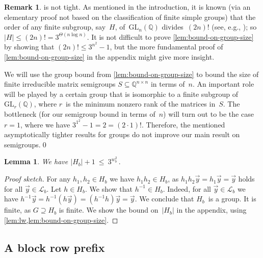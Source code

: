 \documentclass{lmcs}
\newtheorem{lemma}[thm]{Lemma}
\theoremstyle{definition}
\newtheorem{remark}[thm]{Remark}
\newcommand{\GL}{\mathrm{GL}}
\newcommand{\cL}{\mathcal{L}}
\newcommand{\Q}{\mathbb{Q}}
\begin{document}
\begin{remark} \label{rem:bound-on-group-size}
 is not tight.
As mentioned in the introduction, it is known (via an elementary proof not based on the classification of finite simple groups) that the order of any finite subgroup, say~$H$, of~$\GL_n(\Q)$ divides~$(2 n)!$ (see, e.g., \cite[Chapter~IX]{Newman1972}); so $|H| \le (2 n)! = 3^{\Theta(n \log n)}$.
It is not difficult to prove \cref{lem:bound-on-group-size} by showing that $(2 n)! \le 3^{n^2}-1$, but the more fundamental proof of \cref{lem:bound-on-group-size} in the appendix might give more insight.

We will use the group bound from \cref{lem:bound-on-group-size} to bound the size of finite irreducible matrix semigroups $S \subseteq \Q^{n \times n}$ in terms of~$n$.
An important role will be played by a certain group that is isomorphic to a finite subgroup of~$\GL_r(\Q)$, where $r$~is the minimum nonzero rank of the matrices in~$S$.
The bottleneck (for our semigroup bound in terms of~$n$) will turn out to be the case $r=1$, where we have $3^{1^2}-1 = 2 = (2 \cdot 1)!$.
Therefore, the mentioned asymptotically tighter results for groups do not improve our main result on semigroups.\qed
\end{remark}



\begin{lemma} \label{lem:Hb-bound}
We have
$
 |H_b| + 1 \ \le \ 3^{w_b^2}\,.
$
\end{lemma}
\begin{proof}[Proof sketch]
For any $h_1, h_2 \in H_b$ we have $h_1 h_2 \in H_b$, as $h_1 h_2 \vec{y} = h_1 \vec{y} = \vec{y}$ holds for all $\vec{y} \in \cL_b$.
Let $h \in H_b$.
We show that $h^{-1} \in H_b$.
Indeed, for all $\vec{y} \in \cL_b$ we have $h^{-1} \vec{y} = h^{-1} (h \vec{y}) = (h^{-1} h) \vec{y} = \vec{y}$.
We conclude that $H_b$~is a group.
It is finite, as $G \supseteq H_b$ is finite.
We show the bound on~$|H_b|$ in the appendix, using \cref{lem:lw,lem:bound-on-group-size}.
\end{proof}

\subsection{A block row prefix} \label{sub:row-prefix}
\end{document}
